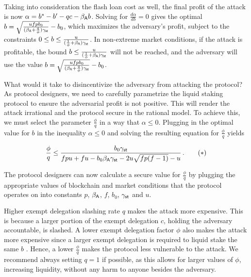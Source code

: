 Taking into consideration the flash loan cost as well, the final profit of the attack is now
$\alpha = b^* - b' - qc - \beta_{\textsf{A}} b$.
Solving for $\frac{d\alpha}{db} = 0$ gives the optimal $b = \sqrt{\frac{u f p b_0}{(\beta_{\textsf{A}} + \frac{q}{\phi})\gamma_{\textsf{st}}}} - b_0$,
which maximizes
the adversary's profit, subject to the constraints
$0 \leq b \leq \frac{u}{(\frac{1}{\phi} + \beta_{\textsf{A}}) \gamma_{\textsf{st}}}$.
In non-extreme market conditions, if the attack is profitable, the bound
$b \leq \frac{u}{(\frac{1}{\phi} + \beta_{\textsf{A}})\gamma_{\textsf{st}}}$ will not be reached,
and the adversary will use the value
$b = \sqrt{\frac{u f p b_0}{(\beta_{\textsf{A}} + \frac{q}{\phi})\gamma_{\textsf{st}}}} - b_0$.

What would it take to disincentivize the adversary from attacking the protocol?
As protocol designers, we need to carefully parametrize the liquid staking protocol
to ensure the adversarial profit is not positive. This will render the attack irrational
and the protocol secure in the rational model. To achieve this, we must select
the parameter $\frac{\phi}{q}$ in a way that $\alpha \leq 0$.
Plugging in the optimal value for $b$ in the inequality $\alpha \leq 0$ and solving
the resulting equation for $\frac{\phi}{q}$ yields

\begin{gather*}
  \frac{\phi}{q} \leq \frac{b_0 \gamma_{\textsf{st}}}{f p u + f u - b_0 \beta_{\textsf{A}} \gamma_{\textsf{st}} - 2 u \sqrt{fp (f-1)} - u}\,. \label{eq:phi-choice} \tag{$\ast$}
\end{gather*}

The protocol designers can now calculate a secure value for $\frac{\phi}{q}$
by plugging
the appropriate values of blockchain and market conditions
that the protocol operates on into
constants $p$, $\beta_{\textsf{A}}$, $f$, $b_0$, $\gamma_{\textsf{st}}$ and $u$.

Higher exempt delegation slashing rate $q$ makes the attack more expensive. This
is because a larger portion of the exempt delegation $c$, holding the adversary accountable,
is slashed. A lower exempt delegation factor $\phi$ also makes the attack more expensive
since a larger exempt delegation is required to liquid stake the same $b$ \asset.
Hence, a lower $\frac{\phi}{q}$ makes the protocol less vulnerable to the attack.
We recommend always setting $q = 1$ if possible, as this allows for
larger values of $\phi$, increasing liquidity, without any harm to anyone
besides the adversary.

